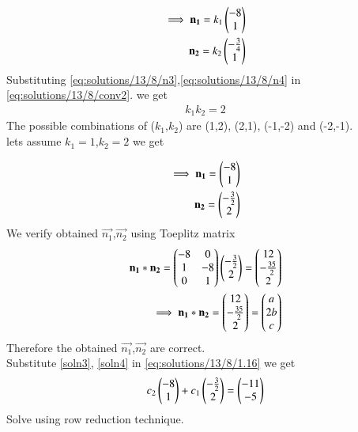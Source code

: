 \begin{align}
    \implies\mathbf{n_1}=k_1\begin{pmatrix}-8\\1\end{pmatrix}\label{eq:solutions/13/8/n3}\\
    \mathbf{n_2}=k_2\begin{pmatrix}-\frac{3}{4}\\1\end{pmatrix}\label{eq:solutions/13/8/n4}
\end{align}
Substituting \eqref{eq:solutions/13/8/n3},\eqref{eq:solutions/13/8/n4} in \eqref{eq:solutions/13/8/conv2}. we get
\begin{align}
    k_1k_2=2
\end{align}
The possible combinations of ($k_1$,$k_2$) are (1,2), (2,1), (-1,-2) and (-2,-1).\\
lets assume $k_1=1$,$k_2=2$ we get

\begin{align}
    \implies\mathbf{n_1}=\begin{pmatrix}-8\\1\end{pmatrix}\label{soln3}\\
    \mathbf{n_2}=\begin{pmatrix}-\frac{3}{2}\\2\end{pmatrix}\label{soln4}
\end{align}
We verify obtained $\vec{n_1}$,$\vec{n_2}$ using Toeplitz matrix
\begin{align}
    \mathbf{n_1}*\mathbf{n_2}=\begin{pmatrix}-8 & 0\\1 & -8\\0 & 1\end{pmatrix}\begin{pmatrix}-\frac{3}{2} \\ 2\end{pmatrix}=\begin{pmatrix}12\\-\frac{35}{2}\\2\end{pmatrix}\\
    \implies\mathbf{n_1}*\mathbf{n_2}=\begin{pmatrix}12\\-\frac{35}{2}\\2\end{pmatrix}=\begin{pmatrix}a\\ 2b \\ c\end{pmatrix}
\end{align}
Therefore the obtained $\vec{n_1}$,$\vec{n_2}$ are correct.\\
Substitute \eqref{soln3}, \eqref{soln4} in \eqref{eq:solutions/13/8/1.16} we get 
\begin{align}
    c_2\begin{pmatrix}-8\\1\end{pmatrix}+c_1\begin{pmatrix}-\frac{3}{2}\\2\end{pmatrix}=\begin{pmatrix} -11\\ -5\end{pmatrix}
\end{align}
Solve using row reduction technique.
